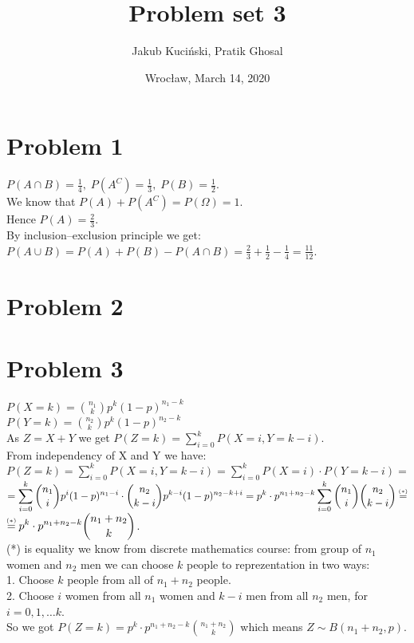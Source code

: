 \documentclass[11pt,wide]{article}
\title{Problem set 3\textdegree}
\date{Wrocław, March 14, 2020}
\author{Jakub Kuciński, Pratik Ghosal}
\newcommand\numeq[1]%
  {\stackrel{\scriptscriptstyle \mkern-1.5mu#1\mkern-1.5mu }{=}}
\begin{document}
\maketitle
\thispagestyle{empty} 
\tableofcontents


\section{Problem 1\textdegree}
\(\displaystyle P(A \cap B) = \frac{1}{4}, \; P(A^C) = \frac{1}{3}, \; P(B) = \frac{1}{2} \). \\
We know that \(\displaystyle P(A) + P(A^C) = P(\Omega) = 1\). \\
Hence \(\displaystyle P(A) = \frac{2}{3}\). \\
By inclusion–exclusion principle we get: \\
\(\displaystyle P(A \cup B) = P(A) + P(B) - P(A\cap B) = \frac{2}{3} + \frac{1}{2} - \frac{1}{4} = \frac{11}{12}\).

\section{Problem 2\textdegree}

\section{Problem 3\textdegree}
\(\displaystyle P(X=k) = \binom{n_1}{k} p^k (1-p)^{n_1-k} \) \\
\(\displaystyle P(Y=k) = \binom{n_2}{k} p^k (1-p)^{n_2-k} \) \\
As \(\displaystyle Z = X + Y \) we get \(\displaystyle P(Z=k) = \sum_{i=0}^k P(X=i, Y=k-i) \). \\
From independency of X and Y we have:\\ \(\displaystyle P(Z=k) = \sum_{i=0}^k P(X=i, Y=k-i) = \sum_{i=0}^k P(X=i)\cdot P(Y=k-i) = \) \\ 
\( \displaystyle = \sum_{i=0}^k \binom{n_1}{i} p^i (1-p)^{n_1-i}\cdot \binom{n_2}{k-i} p^{k-i} (1-p)^{n_2-k+i} = 
p^k \cdot p^{n_1 + n_2 - k} \sum_{i=0}^k \binom{n_1}{i} \binom{n_2}{k-i} \numeq{(*)} \) \\
\(\displaystyle \numeq{(*)} p^k \cdot p^{n_1 + n_2 - k} \binom{n_1 + n_2}{k} \).\\
(*) is equality we know from discrete mathematics course: from group of \(n_1\) women and \(n_2\) men we can choose \(k\) people to reprezentation in two ways: \\
1. Choose \(k\) people from all of \(n_1 + n_2\) people. \\
2. Choose \(i\) women from all \(n_1\) women and \(k-i\) men from all \(n_2\) men, for \(i=0, 1, \ldots k\).\\
So we got \(\displaystyle P(Z=k) = p^k \cdot p^{n_1 + n_2 - k} \binom{n_1 + n_2}{k} \) which means \(Z\sim B(n_1+n_2, p)\).
\end{document}
